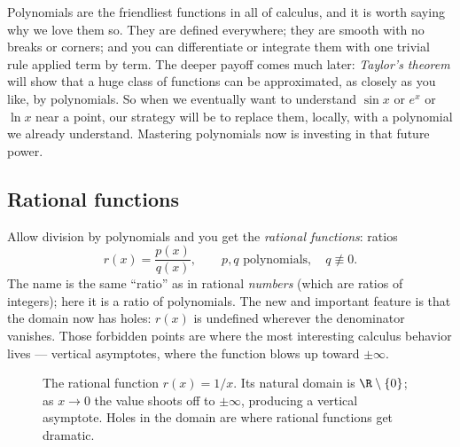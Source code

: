 \begin{aestheticbox}
Polynomials are the friendliest functions in all of calculus, and it is worth
saying why we love them so. They are defined everywhere; they are smooth with no
breaks or corners; and you can differentiate or integrate them with one trivial
rule applied term by term. The deeper payoff comes much later: \emph{Taylor's
theorem} will show that a huge class of functions can be approximated, as closely
as you like, by polynomials. So when we eventually want to understand $\sin x$ or
$e^x$ or $\ln x$ near a point, our strategy will be to replace them, locally, with
a polynomial we already understand. Mastering polynomials now is investing in that
future power.
\end{aestheticbox}

\subsection{Rational functions}

Allow division by polynomials and you get the \emph{rational functions}: ratios
\[
  r(x) = \frac{p(x)}{q(x)}, \qquad p, q \text{ polynomials}, \quad q \not\equiv 0.
\]
The name is the same ``ratio'' as in rational \emph{numbers} (which are ratios of
integers); here it is a ratio of polynomials. The new and important feature is
that the domain now has holes: $r(x)$ is undefined wherever the denominator
vanishes. Those forbidden points are where the most interesting calculus behavior
lives --- vertical asymptotes, where the function blows up toward $\pm\infty$.

\begin{figure}[H]
\centering
{}
\caption{The rational function $r(x)=1/x$. Its natural domain is
$\R\setminus\{0\}$; as $x\to 0$ the value shoots off to $\pm\infty$, producing a
vertical asymptote. Holes in the domain are where rational functions get
dramatic.}
\label{ch02:fig-rational}
\end{figure}

